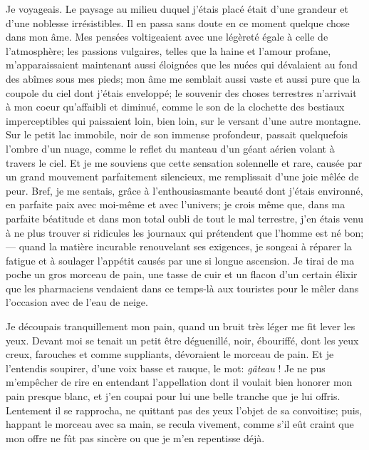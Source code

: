 Je voyageais. Le paysage au milieu duquel j’étais placé
était d’une grandeur et d’une
noblesse irrésistibles. Il en passa sans doute en ce moment quelque
chose dans mon âme. Mes pensées voltigeaient avec une légèreté égale à
celle de l’atmosphère; les passions vulgaires, telles
que la haine et l’amour profane,
m’apparaissaient maintenant aussi éloignées que les
nuées qui dévalaient au fond des abîmes sous mes pieds; mon âme me
semblait aussi vaste et aussi pure que la coupole du ciel dont
j’étais enveloppé; le souvenir des choses terrestres
n’arrivait à mon coeur qu’affaibli et
diminué, comme le son de la clochette des bestiaux imperceptibles qui
paissaient loin, bien loin, sur le versant d’une autre
montagne. Sur le petit lac immobile, noir de son immense profondeur,
passait quelquefois l’ombre d’un
nuage, comme le reflet du manteau d’un géant aérien
volant à travers le ciel. Et je me souviens que cette sensation
solennelle et rare, causée par un grand mouvement parfaitement
silencieux, me remplissait d’une joie mêlée de peur.
Bref, je me sentais, grâce à l’enthousiasmante beauté
dont j’étais environné, en parfaite paix avec
moi{}-même et avec l’univers; je crois même que, dans
ma parfaite béatitude et dans mon total oubli de tout le mal terrestre,
j’en étais venu à ne plus trouver si ridicules les
journaux qui prétendent que l’homme est né bon; ---
quand la matière incurable renouvelant ses exigences, je songeai à
réparer la fatigue et à soulager l’appétit causés par
une si longue ascension. Je tirai de ma poche un gros morceau de pain,
une tasse de cuir et un flacon d’un certain élixir que
les pharmaciens vendaient dans ce temps{}-là aux touristes pour le
mêler dans l’occasion avec de l’eau
de neige.

Je découpais tranquillement mon pain, quand un bruit très léger me fit
lever les yeux. Devant moi se tenait un petit être déguenillé, noir,
ébouriffé, dont les yeux creux, farouches et comme suppliants,
dévoraient le morceau de pain. Et je l’entendis
soupirer, d’une voix basse et rauque, le mot: \textit{gâteau} !
Je ne pus m’empêcher de rire en entendant
l’appellation dont il voulait bien honorer mon pain
presque blanc, et j’en coupai pour lui une belle
tranche que je lui offris. Lentement il se rapprocha, ne quittant pas
des yeux l’objet de sa convoitise; puis, happant le
morceau avec sa main, se recula vivement, comme s’il
eût craint que mon offre ne fût pas sincère ou que je
m’en repentisse déjà.

